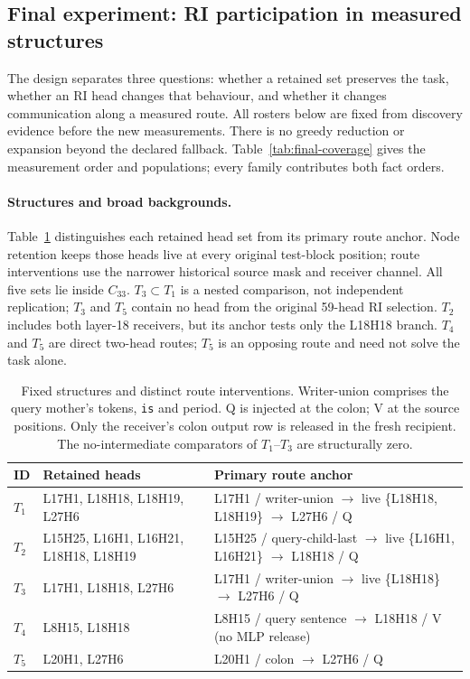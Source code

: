 \subsection{Final experiment: RI participation in measured structures}
\label{app:final-ri}

The design separates three questions: whether a retained set preserves the task,
whether an RI head changes that behaviour, and whether it changes communication
along a measured route. All rosters below are fixed from discovery evidence before
the new measurements. There is no greedy reduction or expansion beyond the
declared fallback. Table~\ref{tab:final-coverage} gives the measurement order and
populations; every family contributes both fact orders.

\paragraph{Structures and broad backgrounds.}
Table~\ref{tab:final-structures} distinguishes each retained head set from its
primary route anchor. Node retention keeps those heads live at every original
test-block position; route interventions use the narrower historical source mask
and receiver channel. All five sets lie inside $C_{33}$. $T_3\subset T_1$ is a
nested comparison, not independent replication; $T_3$ and $T_5$ contain no head
from the original 59-head RI selection. $T_2$ includes both layer-18 receivers,
but its anchor tests only the L18H18 branch. $T_4$ and $T_5$ are direct two-head
routes; $T_5$ is an opposing route and need not solve the task alone.

\begin{table}[t]
\centering\small
\setlength{\tabcolsep}{4pt}
\begin{tabular}{@{}p{}p{}p{}@{}}
\toprule
ID & Retained heads & Primary route anchor \\
\midrule
$T_1$ & L17H1, L18H18, L18H19, L27H6 &
L17H1 / writer-union $\to$ live \{L18H18, L18H19\} $\to$ L27H6 / Q \\
$T_2$ & L15H25, L16H1, L16H21, L18H18, L18H19 &
L15H25 / query-child-last $\to$ live \{L16H1, L16H21\} $\to$ L18H18 / Q \\
$T_3$ & L17H1, L18H18, L27H6 &
L17H1 / writer-union $\to$ live \{L18H18\} $\to$ L27H6 / Q \\
$T_4$ & L8H15, L18H18 &
L8H15 / query sentence $\to$ L18H18 / V (no MLP release) \\
$T_5$ & L20H1, L27H6 &
L20H1 / colon $\to$ L27H6 / Q \\
\bottomrule
\end{tabular}
\caption{Fixed structures and distinct route interventions. Writer-union comprises
the query mother's tokens, \texttt{is} and period. Q is injected at the colon; V at the
source positions. Only the receiver's colon output row is released in the fresh
recipient. The no-intermediate comparators of $T_1$--$T_3$ are structurally zero.}
\label{tab:final-structures}
\end{table}

